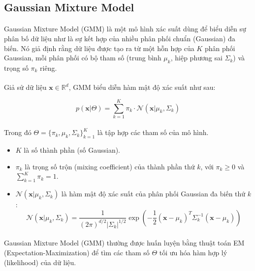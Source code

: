 \subsection{Gaussian Mixture Model}
\paragraph{}{Gaussian Mixture Model (GMM) là một mô hình xác suất dùng để biểu diễn sự phân bố dữ liệu như là sự kết hợp của nhiều phân phối chuẩn (Gaussian) đa biến. Nó giả định rằng dữ liệu được tạo ra từ một hỗn hợp của $K$ phân phối Gaussian, mỗi phân phối có bộ tham số (trung bình $\mu_k$, hiệp phương sai $\Sigma_k$) và trọng số $\pi_k$ riêng.}

\paragraph{}{Giả sử dữ liệu $\mathbf{x} \in \mathbb{R}^d$, GMM biểu diễn hàm mật độ xác suất như sau:}

\begin{equation}
p(\mathbf{x} | \Theta) = \sum_{k=1}^{K} \pi_k \cdot \mathcal{N}(\mathbf{x} | \mu_k, \Sigma_k)
\end{equation}

\paragraph{}{Trong đó $\Theta = \{\pi_k, \mu_k, \Sigma_k\}_{k=1}^K$ là tập hợp các tham số của mô hình.}

\begin{itemize}
  \item $K$ là số thành phần (số Gaussian).
  \item $\pi_k$ là trọng số trộn (mixing coefficient) của thành phần thứ $k$, với $\pi_k \ge 0$ và $\sum_{k=1}^{K} \pi_k = 1$.
  \item $\mathcal{N}(\mathbf{x} | \mu_k, \Sigma_k)$ là hàm mật độ xác suất của phân phối Gaussian đa biến thứ $k$:
  \begin{equation}
    \mathcal{N}(\mathbf{x} | \mu_k, \Sigma_k) = \frac{1}{(2\pi)^{d/2} |\Sigma_k|^{1/2}} \exp\left( -\frac{1}{2}(\mathbf{x} - \mu_k)^T \Sigma_k^{-1} (\mathbf{x} - \mu_k) \right)
  \end{equation}
\end{itemize}

\paragraph{}{Gaussian Mixture Model (GMM) thường được huấn luyện bằng thuật toán EM (Expectation-Maximization) để tìm các tham số $\Theta$ tối ưu hóa hàm hợp lý (likelihood) của dữ liệu.}

